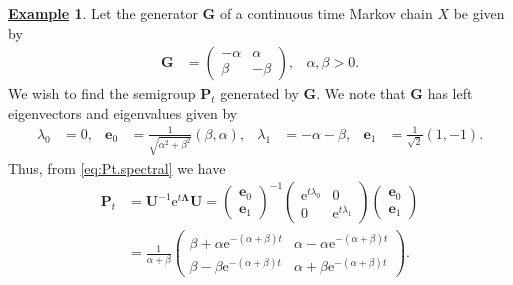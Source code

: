\documentclass[12pt]{book}
\numberwithin{equation}{chapter}
\theoremstyle{plain}
\numberwithin{theorem}{section}
\theoremstyle{definition}
\newtheorem{example}[theorem]{\underline{Example}}
\numberwithin{exercise}{chapter}
\newcommand{\<}{\langle}
\renewcommand{\>}{\rangle}
\renewcommand{\(}{\left(}
\renewcommand{\)}{\right)}
\renewcommand{\[}{\left[}
\renewcommand{\]}{\right]}
\newcommand\lam{\lambda}
\newcommand\ev{\pmb{e}}
\newcommand\Gv{\pmb{G}}
\newcommand\Pv{\pmb{P}}
\newcommand\Uv{\pmb{U}}
\newcommand\Lamv{\pmb{\Lambda}}
\newcommand\ee{\mathrm{e}}
\begin{document}
\begin{example}
\label{ex:ctmc}
Let the generator $\Gv$ of a continuous time Markov chain $X$ be given by
\begin{align}
\Gv
	&=	\( \begin{array}{cc}
			-\alpha & \alpha \\
			\beta & -\beta
			\end{array} \) , &
\alpha, \beta > 0 . \label{eq:G.2state}
\end{align}
We wish to find the semigroup $\Pv_t$ generated by $\Gv$.  We note that $\Gv$ has left eigenvectors and eigenvalues given by
\begin{align}
\lam_0
	&=	0 , &
\ev_0
	&= \frac{1}{\sqrt{\alpha^2 + \beta^2}} (\beta , \alpha), &
\lam_1
	&= - \alpha - \beta	, &
\ev_1
	&=	\frac{1}{\sqrt{2}} ( 1 ,- 1 ) .
\end{align} 
Thus, from \eqref{eq:Pt.spectral} we have
\begin{align}
\Pv_t
	&=		\Uv^{-1} \ee^{t \Lamv} \Uv 
	=			\( \begin{array}{c}
				\ev_0 \\ \ev_1
				\end{array} \)^{-1}
				\( \begin{array}{cc}
				\ee^{t \lam_0} & 0 \\
				0 & \ee^{t \lam_1}
				\end{array} \)
				\( \begin{array}{c}
				\ev_0 \\ \ev_1
				\end{array} \) \\
	&=		\frac{1}{\alpha + \beta} 
				\( \begin{array}{cc}
				\beta + \alpha \ee^{-(\alpha+\beta)t} & \alpha - \alpha \ee^{-(\alpha+\beta)t} \\
				\beta - \beta \ee^{-(\alpha+\beta)t} & \alpha + \beta \ee^{-(\alpha+\beta)t}
				\end{array} \) . \label{eq:Pt.2state}
\end{align}
\end{example}
\end{document}
